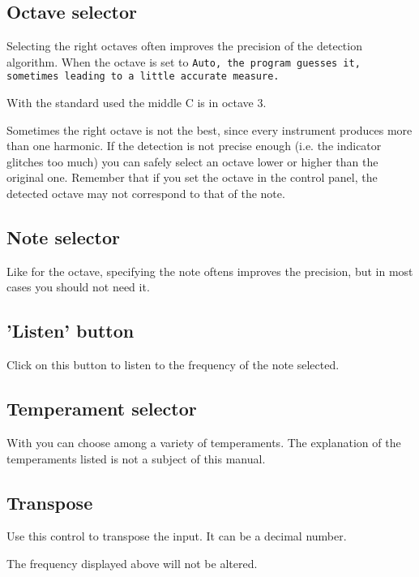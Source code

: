 \subsection{Octave selector}\label{octave}

Selecting the right octaves often improves the precision of the
detection algorithm. When the octave is set to \tt{Auto}, the program
guesses it, sometimes leading to a little accurate measure.

With the standard used the middle C is in octave 3.

Sometimes the right octave is not the best, since every instrument
produces more than one harmonic. If the detection is not precise
enough (i.e. the indicator glitches too much) you can safely select
an octave lower or higher than the original one.
Remember that if you set the octave in the control panel, the detected
octave may not correspond to that of the note.

\subsection{Note selector}\label{note}

Like for the octave, specifying the note oftens improves the precision,
but in most cases you should not need it.

\subsection{'Listen' button}\label{listen}

Click on this button to listen to the frequency of the note selected.

\subsection{Temperament selector}\label{temperament}

With  you can choose among a variety of temperaments.
The explanation of the temperaments listed is not a subject of this
manual.

\subsection{Transpose}\label{transpose}

Use this control to transpose the input. It can be a decimal number.

The frequency displayed above will not be altered.

